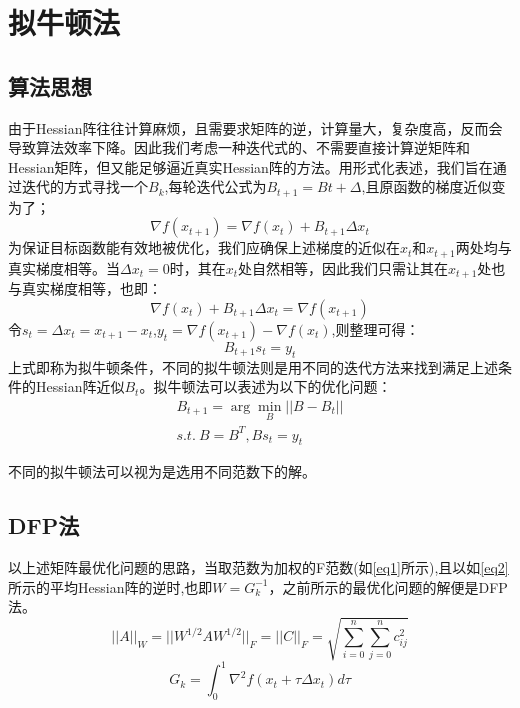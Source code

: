 \documentclass{SCIS2020cn}
\begin{document}
\section{拟牛顿法}
\subsection{算法思想}
由于Hessian阵往往计算麻烦，且需要求矩阵的逆，计算量大，复杂度高，反而会导致算法效率下降。因此我们考虑一种迭代式的、不需要直接计算逆矩阵和Hessian矩阵，但又能足够逼近真实Hessian阵的方法。用形式化表述，我们旨在通过迭代的方式寻找一个$B_k$,每轮迭代公式为$B_{t+1}=B{t}+\Delta$,且原函数的梯度近似变为了；
\begin{equation*}
{\nabla f(x_{t+1})}=\nabla f(x_t)+B_{t+1}\Delta x_t 
\end{equation*}
为保证目标函数能有效地被优化，我们应确保上述梯度的近似在$x_t$和$x_{t+1}$两处均与真实梯度相等。当$\Delta x_t=0$时，其在$x_t$处自然相等，因此我们只需让其在$x_{t+1}$处也与真实梯度相等，也即：
\begin{equation*}
    \nabla f(x_t)+B_{t+1}\Delta x_t =\nabla f(x_{t+1})
\end{equation*}
令$s_t=\Delta x_t=x_{t+1}-x_t$,$y_t=\nabla f(x_{t+1})-\nabla f(x_t)$,则整理可得：
\begin{equation}
    B_{t+1}s_t=y_t
\end{equation}
上式即称为拟牛顿条件，不同的拟牛顿法则是用不同的迭代方法来找到满足上述条件的Hessian阵近似$B_t$。拟牛顿法可以表述为以下的优化问题：
\begin{eqnarray}
    B_{t+1}=\arg\min_B ||B-B_t||\\
    s.t.\ B=B^T, Bs_t=y_t
\end{eqnarray}

不同的拟牛顿法可以视为是选用不同范数下的解。

\subsection{DFP法 }
以上述矩阵最优化问题的思路，当取范数为加权的F范数(如\ref{eq1}所示),且以如\ref{eq2}所示的平均Hessian阵的逆时,也即$W=G_k^{-1}$，之前所示的最优化问题的解便是DFP法。
\begin{equation}
    \label{eq1}
    ||A||_W=||W^{1/2}AW^{1/2}||_F=||C||_F=\sqrt{\sum_{i=0}^n\sum_{j=0}^nc^2_{ij}}
\end{equation}
\begin{equation}
    \label{eq2}
    G_k=\int_0^1 \nabla^2 f(x_t+\tau \Delta x_t)d\tau
\end{equation}
\end{document}
